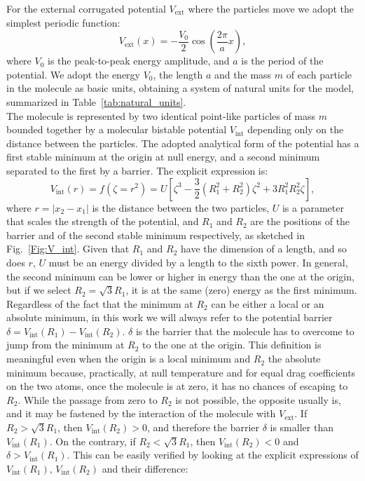 For the external corrugated potential $V_\text{ext}$ where the particles move we adopt the simplest periodic function:
\begin{equation}
    V_\text{ext}(x) = - \frac{V_0}{2}\cos\left(\frac{2\pi}{a}x \right), 
\end{equation}
where $V_0$ is the peak-to-peak energy amplitude, and $a$ is the period of the potential. We adopt the energy $V_0$, the length $a$ and the mass $m$ of each particle in the molecule as basic units, obtaining a system of natural units for the model, summarized in Table~\ref{tab:natural_units}. \\

The molecule is represented by two identical point-like particles of mass $m$ bounded together by a molecular bistable potential $V_\text{int}$ depending only on the distance between the particles. %
The adopted analytical form of the potential has a first stable minimum at the origin at null energy, and a second minimum separated to the first by a barrier. The explicit expression is:
\begin{equation}
    V_\text{int}(r) = f( \zeta = r^2) = U\left[\zeta^3- \frac{3}{2}(R_1^2 + R_2^2)\zeta^2 + 3 R_1^2 R_2^2 \zeta \right],
    \label{eq:V_int}
\end{equation}
where $r = |x_2 - x_1|$ is the distance between the two particles, $U$ is a parameter that scales the strength of the potential, and $R_1$ and $R_2$ are the positions of the barrier and of the second stable minimum respectively, as sketched in Fig.~\ref{Fig:V_int}. Given that $R_1$ and $R_2$ have the dimension of a length, and so does $r$, $U$ must be an energy divided by a length to the sixth power. In general, the second minimum can be lower or higher in energy than the one at the origin, but if we select $R_2 = \sqrt{3}R_1$, it is at the same (zero) energy as the first minimum. Regardless of the fact that the minimum at $R_2$ can be either a local or an absolute minimum, in this work we will always refer to the potential barrier $\delta = V_\text{int}(R_1) - V_\text{int}(R_2)$. $\delta$ is the barrier that the molecule has to overcome to jump from the minimum at $R_2$ to the one at the origin. This definition is meaningful even when the origin is a local minimum and $R_2$ the absolute minimum because, practically, at null temperature and for equal drag coefficients on the two atoms, once the molecule is at zero, it has no chances of escaping to $R_2$. While the passage from zero to $R_2$ is not possible, the opposite usually is, and it may be fastened by the interaction of the molecule with $V_\text{ext}$. If $R_2 > \sqrt{3}R_1$, then $V_\text{int}(R_2) > 0$, and therefore the barrier $\delta$ is smaller than $V_\text{int}(R_1)$. On the contrary, if $R_2 < \sqrt{3}R_1$, then $V_\text{int}(R_2) < 0$ and $\delta > V_\text{int}(R_1)$. This can be easily verified by looking at the explicit expressions of $V_\text{int}(R_1)$, $V_\text{int}(R_2)$ and their difference:
